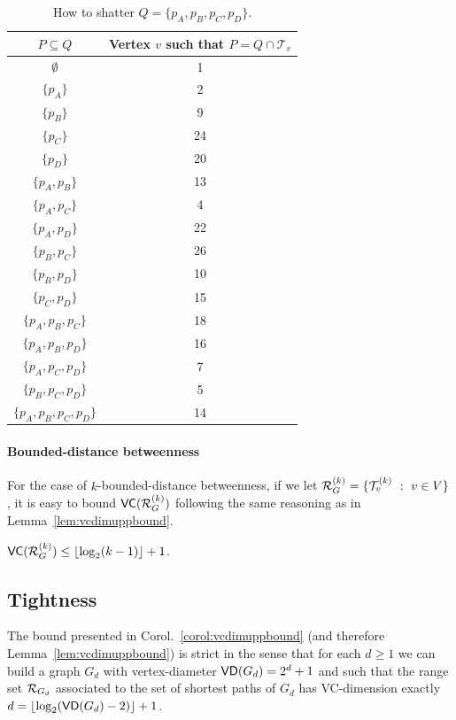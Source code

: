 \begin{table}[htb]
  \centering
  \begin{small}
    \begin{tabular}{cc}
	  \toprule
	  $P\subseteq Q$ & Vertex $v$ such that $P=Q\cap\mathcal{T}_v$ \\
	  \midrule
	  $\emptyset$ & 1\\
	  $\{p_A\}$ & 2\\
	  $\{p_B\}$ & 9\\
	  $\{p_C\}$ & 24\\
	  $\{p_D\}$ & 20\\
	  $\{p_A,p_B\}$ & 13 \\
	  $\{p_A,p_C\}$ & 4\\
	  $\{p_A,p_D\}$ & 22 \\
	  $\{p_B,p_C\}$ & 26 \\
	  $\{p_B,p_D\}$ & 10 \\
	  $\{p_C,p_D\}$ & 15 \\
	  $\{p_A,p_B,p_C\}$ & 18 \\
	  $\{p_A,p_B,p_D\}$ & 16\\
	  $\{p_A,p_C,p_D\}$ & 7\\
	  $\{p_B,p_C,p_D\}$ & 5\\
	  $\{p_A,p_B,p_C,p_D\}$ & 14\\
	  \bottomrule
	\end{tabular}
  \end{small}
  \caption{How to shatter $Q=\{p_A,p_B,p_C,p_D\}$.}
  \label{tab:counterexampleshatter}
\end{table}

\fi

\ifproof
\else
\paragraph{Bounded-distance betweenness}
For the case of $k$-bounded-distance betweenness, if we let
$\mathcal{R}_G^{(k)}=\{\mathcal{T}_v^{(k)}~:~ v\in V\}$, it is easy to bound
$\mathsf{VC}(\mathcal{R}_G^{(k)})$ following the same reasoning as in
Lemma~\ref{lem:vcdimuppbound}.
\begin{lemma}\label{lem:vcdimuppboundk}
$\mathsf{VC}(\mathcal{R}_G^{(k)})\le\lfloor\log_2(k-1)\rfloor+1$.
\end{lemma}
\fi

\subsection{Tightness}\label{sec:tightness}
The bound presented in Corol.~\ref{corol:vcdimuppbound} (and therefore
Lemma~\ref{lem:vcdimuppbound}) is strict in the sense that
for each $d\ge 1$ we can build a graph $G_d$ with vertex-diameter
$\mathsf{VD}(G_d)=2^d+1$ and such that the range set $\mathcal{R}_{G_d}$ associated to the set of
shortest paths of $G_d$ has VC-dimension exactly
$d=\lfloor\log_2(\mathsf{VD}(G_d)-2)\rfloor+1$. 

